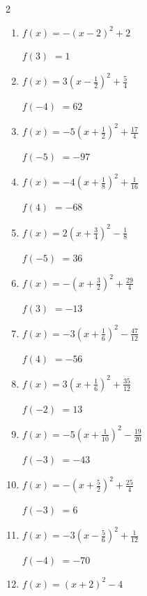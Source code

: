 \begin{multicols}{2}
\begin{enumerate}
  \item $\displaystyle f(x)=-\left( x-2\right)^{2}+2$

$f(3)$
        $=1$

  \item $\displaystyle f(x)=3\left( x-\frac{1}{2}\right)^{2}+\frac{5}{4}$

$f(-4)$
        $=62$

  \item $\displaystyle f(x)=-5\left( x+\frac{1}{2}\right)^{2}+\frac{17}{4}$

$f(-5)$
        $=-97$

\columnbreak %

  \item $\displaystyle f(x)=-4\left( x+\frac{1}{8}\right)^{2}+\frac{1}{16}$

$f(4)$
        $=-68$

  \item $\displaystyle f(x)=2\left( x+\frac{3}{4}\right)^{2}-\frac{1}{8}$

$f(-5)$
        $=36$

  \item $\displaystyle f(x)=-\left( x+\frac{3}{2}\right)^{2}+\frac{29}{4}$

$f(3)$
        $=-13$

  \item $\displaystyle f(x)=-3\left( x+\frac{1}{6}\right)^{2}-\frac{47}{12}$

$f(4)$
        $=-56$

  \item $\displaystyle f(x)=3\left( x+\frac{1}{6}\right)^{2}+\frac{35}{12}$

$f(-2)$
        $=13$

\columnbreak %

\resetques

  \item $\displaystyle f(x)=-5\left( x+\frac{1}{10}\right)^{2}-\frac{19}{20}$

$f(-3)$
        $=-43$

  \item $\displaystyle f(x)=-\left( x+\frac{5}{2}\right)^{2}+\frac{25}{4}$

$f(-3)$
        $=6$

  \item $\displaystyle f(x)=-3\left( x-\frac{5}{6}\right)^{2}+\frac{1}{12}$

$f(-4)$
        $=-70$

  \item $\displaystyle f(x)=\left( x+2\right)^{2}-4$


\end{enumerate}
\end{multicols}
